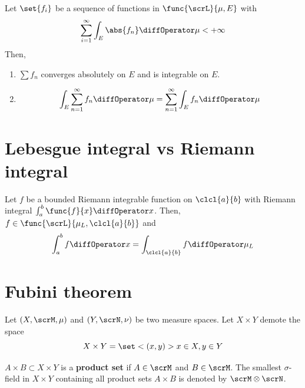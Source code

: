 \begin{corollary}
    Let \(\set{f_i}\) be a sequence of functions in \(\func{\scrL}{\mu,E}\) with 
    \begin{equation*}
        \sum_{i = 1}^{\infty} \int_E \abs{f_n} \diffOperator \mu < + \infty 
    \end{equation*}
    Then, 
    \begin{enumerate}
        \item \(\sum f_n\) converges absolutely \alev on \(E\) and is integrable on \(E\).
        \item  
        \begin{equation*}
            \int_E \sum_{n = 1}^{\infty} f_n \diffOperator \mu = \sum_{n = 1}^{\infty }\int_E f_n \diffOperator\mu 
        \end{equation*} 
    \end{enumerate}
\end{corollary}

\section{Lebesgue integral vs Riemann integral}
\begin{theorem}
    Let \(f\) be a bounded Riemann integrable function on \(\clcl{a}{b}\) with Riemann integral \(\int_a^b \func{f}{x} \diffOperator x\). Then, \(f \in \func{\scrL}{\mu_L,\clcl{a}{b}}\) and 
    \begin{equation*}
        \int_a^b f \diffOperator x = \int_{\clcl{a}{b}} f \diffOperator \mu_L
    \end{equation*}
\end{theorem}

\section{Fubini theorem}
Let \((X,\scrM,\mu)\) and \((Y,\scrN,\nu)\) be two measure spaces. Let \(X \times Y\) demote the space 
\begin{equation*}
    X \times Y = \set<(x,y)>{x \in X,y \in Y}
\end{equation*}

\begin{definition}
    \(A \times B \subset X \times Y\) is a \textbf{product set} if \(A \in \scrM\) and \(B \in \scrM\). The smallest \(\sigma\)-field in \(X \times Y\) containing all product sets \(A \times B\) is denoted by \(\scrM \otimes \scrN\). 
\end{definition}

